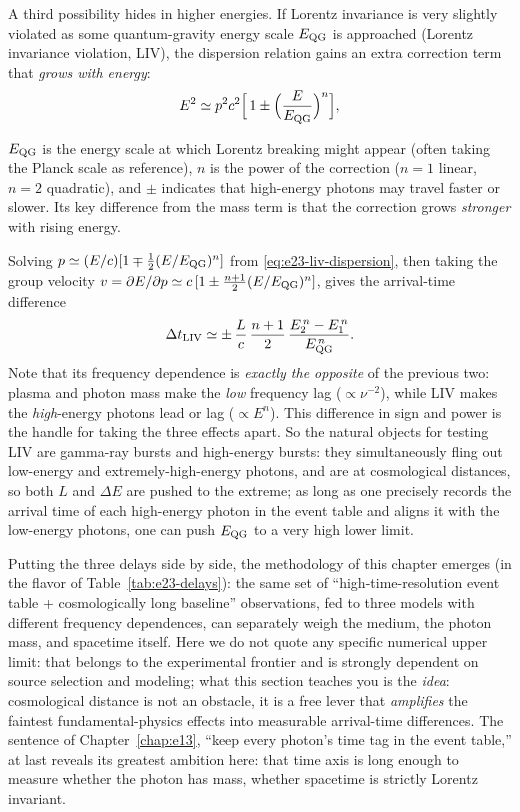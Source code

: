 A third possibility hides in higher energies. If Lorentz invariance is very slightly violated as some quantum-gravity energy scale \(E_{\rm QG}\) is approached (Lorentz invariance violation, LIV), the dispersion relation gains an extra correction term that \emph{grows with energy}:
\begin{equation}
  E^2\simeq p^2c^2\Bigl[\,1\pm\Bigl(\frac{E}{E_{\rm QG}}\Bigr)^{n}\Bigr],
  \label{eq:e23-liv-dispersion}
\end{equation}
\begin{formulaexplain}
\(E_{\rm QG}\) is the energy scale at which Lorentz breaking might appear (often taking the Planck scale as reference), \(n\) is the power of the correction (\(n=1\) linear, \(n=2\) quadratic), and \(\pm\) indicates that high-energy photons may travel faster or slower. Its key difference from the mass term is that the correction grows \emph{stronger} with rising energy.
\end{formulaexplain}
Solving \(p\simeq(E/c)[1\mp\tfrac12(E/E_{\rm QG})^n]\) from \eqref{eq:e23-liv-dispersion}, then taking the group velocity \(v=\partial E/\partial p\simeq c\,[1\pm\tfrac{n+1}{2}(E/E_{\rm QG})^n]\), gives the arrival-time difference
\[
  \Delta t_{\rm LIV}\simeq\pm\,\frac{L}{c}\,\frac{n+1}{2}\,\frac{E_2^{\,n}-E_1^{\,n}}{E_{\rm QG}^{\,n}} .
\]
Note that its frequency dependence is \emph{exactly the opposite} of the previous two: plasma and photon mass make the \emph{low} frequency lag (\(\propto\nu^{-2}\)), while LIV makes the \emph{high}-energy photons lead or lag (\(\propto E^{n}\)). This difference in sign and power is the handle for taking the three effects apart. So the natural objects for testing LIV are gamma-ray bursts and high-energy bursts: they simultaneously fling out low-energy and extremely-high-energy photons, and are at cosmological distances, so both \(L\) and \(\Delta E\) are pushed to the extreme; as long as one precisely records the arrival time of each high-energy photon in the event table and aligns it with the low-energy photons, one can push \(E_{\rm QG}\) to a very high lower limit.

Putting the three delays side by side, the methodology of this chapter emerges (in the flavor of Table~\ref{tab:e23-delays}): the same set of ``high-time-resolution event table + cosmologically long baseline'' observations, fed to three models with different frequency dependences, can separately weigh the medium, the photon mass, and spacetime itself. Here we do not quote any specific numerical upper limit: that belongs to the experimental frontier and is strongly dependent on source selection and modeling; what this section teaches you is the \emph{idea}: cosmological distance is not an obstacle, it is a free lever that \emph{amplifies} the faintest fundamental-physics effects into measurable arrival-time differences. The sentence of Chapter~\ref{chap:e13}, ``keep every photon's time tag in the event table,'' at last reveals its greatest ambition here: that time axis is long enough to measure whether the photon has mass, whether spacetime is strictly Lorentz invariant.

